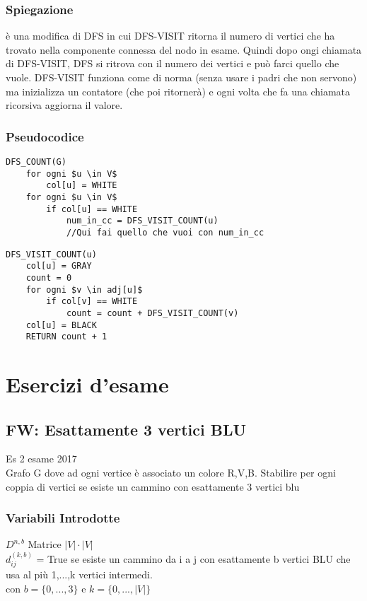 \documentclass[12pt, a4paper, openany]{book}
\begin{document}
\subsection*{Spiegazione}
è una modifica di DFS in cui DFS-VISIT ritorna il numero di vertici che ha trovato nella componente connessa
del nodo in esame. Quindi dopo ongi chiamata di DFS-VISIT, DFS si ritrova con il numero dei vertici e può farci quello che vuole.
DFS-VISIT funziona come di norma (senza usare i padri che non servono) ma inizializza un contatore (che poi ritornerà) e ogni volta
che fa una chiamata ricorsiva aggiorna il valore.

\subsection*{Pseudocodice}

\begin{lstlisting}[mathescape=true]
DFS_COUNT(G)
    for ogni $u \in V$
        col[u] = WHITE
    for ogni $u \in V$
        if col[u] == WHITE
            num_in_cc = DFS_VISIT_COUNT(u)
            //Qui fai quello che vuoi con num_in_cc 
\end{lstlisting}

\begin{lstlisting}[mathescape=true]
DFS_VISIT_COUNT(u)
    col[u] = GRAY
    count = 0
    for ogni $v \in adj[u]$
        if col[v] == WHITE
            count = count + DFS_VISIT_COUNT(v)
    col[u] = BLACK
    RETURN count + 1
\end{lstlisting}

\chapter{Esercizi d'esame}

\section{FW: Esattamente 3 vertici BLU} Es 2 esame 2017\\
Grafo G dove ad ogni vertice è associato un colore {R,V,B}. Stabilire per ogni coppia di vertici se esiste un cammino con esattamente 3 vertici blu

\subsection*{Variabili Introdotte}
$D^{n,b}$ Matrice $|V|\cdot|V|$\\
$d^{(k,b)}_{ij}$ = True se esiste un cammino da i a j con esattamente b vertici BLU che usa al più {1,...,k} vertici intermedi.\\
con $b = \{0,...,3\}$ e $k=\{0,...,|V|\}$
\end{document}
